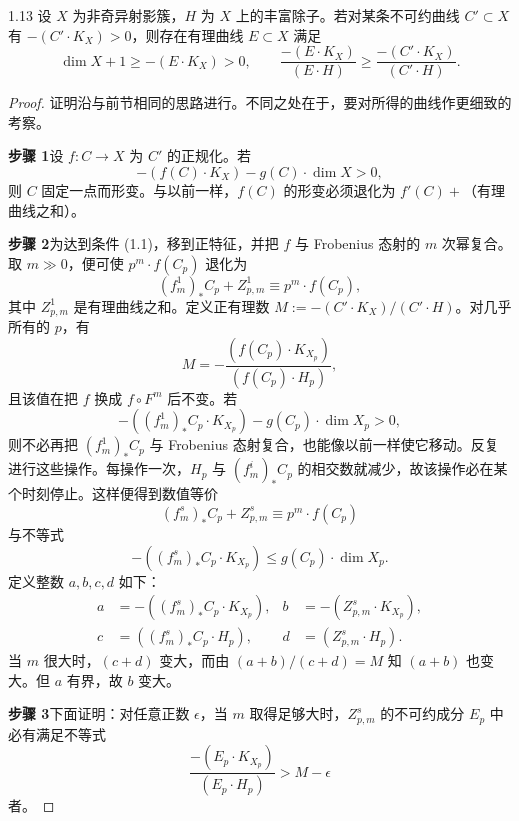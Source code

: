 \begin{theoremp}[{[Mor82]}]{1.13}
设 $X$ 为非奇异射影簇，$H$ 为 $X$ 上的丰富除子。若对某条不可约曲线 $C'\subset X$ 有 $-(C'\cdot K_X)>0$，则存在有理曲线 $E\subset X$ 满足
\[ \dim X+1\ge -(E\cdot K_X)>0,\qquad \frac{-(E\cdot K_X)}{(E\cdot H)}\ge\frac{-(C'\cdot K_X)}{(C'\cdot H)}. \]
\end{theoremp}

\begin{proof}
证明沿与前节相同的思路进行。不同之处在于，要对所得的曲线作更细致的考察。

\textbf{步骤 1}\quad 设 $f:C\to X$ 为 $C'$ 的正规化。若
\begin{equation}\tag{1.1}
-(f(C)\cdot K_X)-g(C)\cdot\dim X>0,
\end{equation}
则 $C$ 固定一点而形变。与以前一样，$f(C)$ 的形变必须退化为 $f'(C)+$（有理曲线之和）。

\textbf{步骤 2}\quad 为达到条件 (1.1)，移到正特征，并把 $f$ 与 Frobenius 态射的 $m$ 次幂复合。取 $m\gg0$，便可使 $p^m\cdot f(C_p)$ 退化为
\begin{equation}\tag{1.2}
(f^1_m)_*C_p+Z^1_{p,m}\equiv p^m\cdot f(C_p),
\end{equation}
其中 $Z^1_{p,m}$ 是有理曲线之和。定义正有理数 $M:=-(C'\cdot K_X)/(C'\cdot H)$。对几乎所有的 $p$，有
\[ M=-\frac{(f(C_p)\cdot K_{X_p})}{(f(C_p)\cdot H_p)}, \]
且该值在把 $f$ 换成 $f\circ F^m$ 后不变。若
\[ -((f^1_m)_*C_p\cdot K_{X_p})-g(C_p)\cdot\dim X_p>0, \]
则不必再把 $(f^1_m)_*C_p$ 与 Frobenius 态射复合，也能像以前一样使它移动。反复进行这些操作。每操作一次，$H_p$ 与 $(f^i_m)_*C_p$ 的相交数就减少，故该操作必在某个时刻停止。这样便得到数值等价
\[ (f^s_m)_*C_p+Z^s_{p,m}\equiv p^m\cdot f(C_p) \]
与不等式
\[ -((f^s_m)_*C_p\cdot K_{X_p})\le g(C_p)\cdot\dim X_p. \]
定义整数 $a,b,c,d$ 如下：
\begin{equation*}
\begin{aligned}
a&=-((f^s_m)_*C_p\cdot K_{X_p}), & b&=-(Z^s_{p,m}\cdot K_{X_p}),\\
c&=((f^s_m)_*C_p\cdot H_p), & d&=(Z^s_{p,m}\cdot H_p).
\end{aligned}
\end{equation*}
当 $m$ 很大时，$(c+d)$ 变大，而由 $(a+b)/(c+d)=M$ 知 $(a+b)$ 也变大。但 $a$ 有界，故 $b$ 变大。


\textbf{步骤 3}\quad 下面证明：对任意正数 $\epsilon$，当 $m$ 取得足够大时，$Z^s_{p,m}$ 的不可约成分 $E_p$ 中必有满足不等式
\begin{equation}\tag{1.3}
\frac{-(E_p\cdot K_{X_p})}{(E_p\cdot H_p)}>M-\epsilon
\end{equation}
者。


\end{proof}
